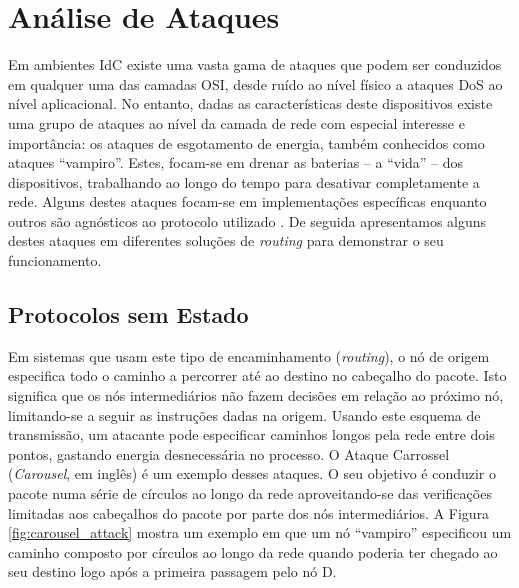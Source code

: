\documentclass{llncs}
\begin{document}
\section{Análise de Ataques}
\label{sec:attack_analysis}

Em ambientes \ac{IdC} existe uma vasta gama de ataques que podem ser conduzidos em qualquer uma das camadas \ac{OSI}, desde ruído ao nível físico a ataques \ac{DoS} ao nível aplicacional. 
No entanto, dadas as características deste dispositivos existe uma grupo de ataques ao nível da camada de rede com especial interesse e importância: os ataques de esgotamento de energia, também conhecidos como ataques ``vampiro''.
Estes, focam-se em drenar as baterias -- a ``vida'' -- dos dispositivos, trabalhando ao longo do tempo para desativar completamente a rede.
Alguns destes ataques focam-se em implementações específicas enquanto outros são agnósticos ao protocolo utilizado \cite{Vasserman2013}\cite{Pongle2015}. 
De seguida apresentamos alguns destes ataques em diferentes soluções de \textit{routing} para demonstrar o seu funcionamento.

\subsection{Protocolos sem Estado}
\label{sec:source_routing}
Em sistemas que usam este tipo de encaminhamento (\textit{routing}), o nó de origem especifica todo o caminho a percorrer até ao destino no cabeçalho do pacote. 
Isto significa que os nós intermediários não fazem decisões em relação ao próximo nó, limitando-se a seguir as instruções dadas na origem. 
Usando este esquema de transmissão, um atacante pode especificar caminhos longos pela rede 
entre dois pontos, gastando energia desnecessária no processo. 
O Ataque Carrossel (\textit{Carousel}, em inglês) é um exemplo desses ataques. 
O seu objetivo é conduzir o pacote numa série de círculos ao longo da rede aproveitando-se das verificações limitadas aos cabeçalhos do pacote por parte dos nós intermediários. 
A Figura \ref{fig:carousel_attack} mostra um exemplo em que um nó ``vampiro'' especificou um caminho composto por círculos ao longo da rede quando poderia ter chegado ao seu destino logo após a primeira passagem pelo nó D.
\end{document}
